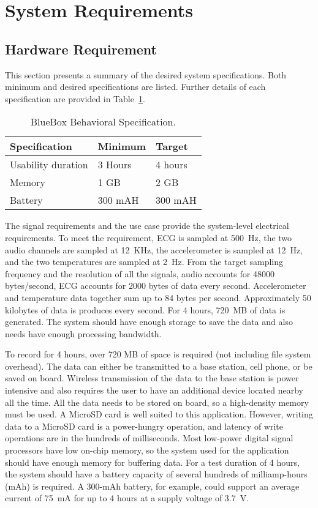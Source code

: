 \section{System Requirements}\label{system requirements}
\subsection{Hardware Requirement}

This section presents a summary of the desired system
specifications.  Both minimum and desired specifications are listed.
Further details of each specification are provided in
Table~\ref{table:Behavioural_specs}.

\begin{table}
	\caption{BlueBox Behavioral Specification.}
	\label{table:Behavioural_specs}
	\centering
	\begin{tabular}{|l|l|l|}
		\hline
		Specification & Minimum & Target \\
		\hline
		Usability duration & 3 Hours & 4 hours \\
		Memory & 1 GB & 2 GB \\
		Battery & 300 mAH & 300 mAH \\
		\hline
	\end{tabular}
\end{table}

The signal requirements and the use case provide the system-level
electrical requirements. To meet the requirement, ECG is sampled at
500~Hz, the two audio channels are sampled at 12~KHz, the
accelerometer is sampled at 12~Hz, and the two temperatures are
sampled at 2~Hz. From the target sampling frequency and the
resolution of all the signals, audio accounts for 48000 bytes/second,
ECG accounts for 2000 bytes of data every second. Accelerometer and
temperature data together sum up to 84 bytes per second.
Approximately 50 kilobytes of data is produces every second. For 4
hours, 720~MB of data is generated. The system should have enough
storage to save the data and also needs have enough processing
bandwidth.

To record for 4 hours, over 720 MB of space is required (not
including file system overhead). The data can either be transmitted
to a base station, cell phone, or be saved on board. Wireless
transmission of the data to the base station is power intensive and
also requires the user to have an additional device located nearby
all the time. All the data needs to be stored on board, so a
high-density memory must be used. A MicroSD card is well suited to
this application. However, writing data to a MicroSD card is a
power-hungry operation, and latency of write operations are in the
hundreds of milliseconds. Most low-power digital signal processors
have low on-chip memory, so the system used for the application
should have enough memory for buffering data. For a test duration of
4 hours, the system should have a battery capacity of several
hundreds of milliamp-hours (mAh) is required. A 300-mAh battery, for
example, could support an average current of 75~mA for up to 4 hours
at a supply voltage of 3.7~V. 


